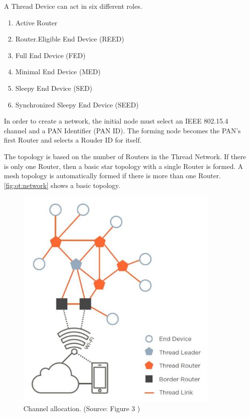 A Thread Device can act in six different roles.
\begin{enumerate}
    \item Active Router
    \item Router.Eligible End Device (REED)
    \item Full End Device (FED)
    \item Minimal End Device (MED)
    \item Sleepy End Device (SED)
    \item Synchronized Sleepy End Device (SEED)
\end{enumerate}

In order to create a network, the initial node must select an IEEE 802.15.4 channel and
a PAN Identifier (PAN ID).
The forming node becomes the PAN's first Router and selects a Rouder ID for itself.

The topology is based on the number of Routers in the Thread Network.
If there is only one Router, then a basic star topology with a single Router is formed.
A mesh topology is automatically formed if there is more than one Router.
\autoref{fig:ot:network} shows a basic topology.

\begin{figure}[!ht]
    \centering
    \includegraphics[width=100mm, keepaspectratio]{figures/thread-topology-ThreadNetworkFundamentals_633_4.jpg}
    \caption{Channel allocation. (Source: Figure 3 \cite{thread:nfwp})}
    \label{fig:ot:network}
\end{figure}

